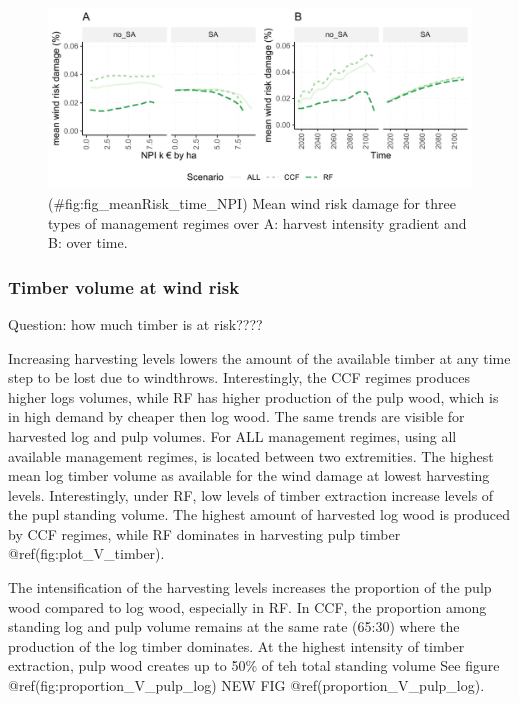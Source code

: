 \documentclass[]{elsarticle} %
\makeatletter
\def\maxwidth{\ifdim\Gin@nat@width>\linewidth\linewidth
\else\Gin@nat@width\fi}
\let\Oldincludegraphics\includegraphics
\renewcommand{\includegraphics}[1]{\Oldincludegraphics[width=\maxwidth]{#1}}
\makeatother
\begin{document}
\begin{figure}
\centering
\includegraphics{test_manus_files/figure-latex/fig_meanRisk_time_NPI-1.pdf}
\caption{(\#fig:fig\_meanRisk\_time\_NPI)\label{fig:fig_meanRisk_time_NPI}
Mean wind risk damage for three types of management regimes over A:
harvest intensity gradient and B: over time.}
\end{figure}

\subsubsection{Timber volume at wind
risk}\label{timber-volume-at-wind-risk}

Question: how much timber is at risk????

Increasing harvesting levels lowers the amount of the available timber
at any time step to be lost due to windthrows. Interestingly, the CCF
regimes produces higher logs volumes, while RF has higher production of
the pulp wood, which is in high demand by cheaper then log wood. The
same trends are visible for harvested log and pulp volumes. For ALL
management regimes, using all available management regimes, is located
between two extremities. The highest mean log timber volume as available
for the wind damage at lowest harvesting levels. Interestingly, under
RF, low levels of timber extraction increase levels of the pupl standing
volume. The highest amount of harvested log wood is produced by CCF
regimes, while RF dominates in harvesting pulp timber
@ref(fig:plot\_V\_timber).

The intensification of the harvesting levels increases the proportion of
the pulp wood compared to log wood, especially in RF. In CCF, the
proportion among standing log and pulp volume remains at the same rate
(65:30) where the production of the log timber dominates. At the highest
intensity of timber extraction, pulp wood creates up to 50\% of teh
total standing volume See figure @ref(fig:proportion\_V\_pulp\_log) NEW
FIG @ref(proportion\_V\_pulp\_log).
\end{document}
